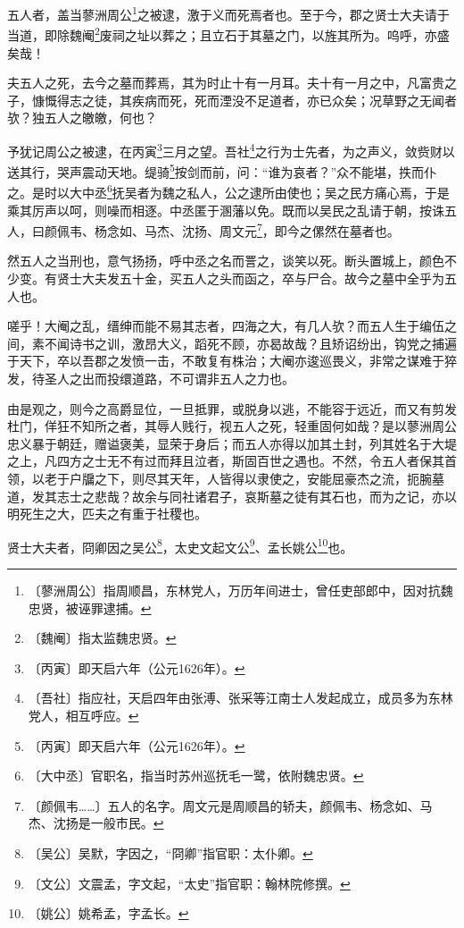 \documentclass[12pt,UTF-8,openany,a4]{ctexbook}
\begin{document}
\begin{large}
    
    五人者，盖当蓼洲周公\footnote{〔蓼洲周公〕\yiwen 指周顺昌，东林党人，万历年间进士，曾任吏部郎中，因对抗魏忠贤，被诬罪逮捕。}之被逮，激于义而死焉者也。至于今，郡之贤士大夫请于当道，即除魏阉\footnote{〔魏阉〕\yiwen 指太监魏忠贤。}废祠之址以葬之；且立石于其墓之门，以旌其所为。呜呼，亦盛矣哉！
    
    夫五人之死，去今之墓而葬焉，其为时止十有一月耳。夫十有一月之中，凡富贵之子，慷慨得志之徒，其疾病而死，死而湮没不足道者，亦已众矣；况草野之无闻者欤？独五人之皦皦，何也？
    
    予犹记周公之被逮，在丙寅\footnote{〔丙寅〕\yiwen 即天启六年（公元1626年）。}三月之望。吾社\footnote{〔吾社〕\yiwen 指应社，天启四年由张溥、张采等江南士人发起成立，成员多为东林党人，相互呼应。}之行为士先者，为之声义，敛赀财以送其行，哭声震动天地。缇骑\footnote{〔丙寅〕\yiwen 即天启六年（公元1626年）。}按剑而前，问：“谁为哀者？”众不能堪，抶而仆之。是时以大中丞\footnote{〔大中丞〕\yiwen 官职名，指当时苏州巡抚毛一鹭，依附魏忠贤。}抚吴者为魏之私人，公之逮所由使也；吴之民方痛心焉，于是乘其厉声以呵，则噪而相逐。中丞匿于溷藩以免。既而以吴民之乱请于朝，按诛五人，曰颜佩韦、杨念如、马杰、沈扬、周文元\footnote{〔颜佩韦……〕\yiwen 五人的名字。周文元是周顺昌的轿夫，颜佩韦、杨念如、马杰、沈扬是一般市民。}，即今之傫然在墓者也。
    
    然五人之当刑也，意气扬扬，呼中丞之名而詈之，谈笑以死。断头置城上，颜色不少变。有贤士大夫发五十金，买五人之头而函之，卒与尸合。故今之墓中全乎为五人也。
    
    嗟乎！大阉之乱，缙绅而能不易其志者，四海之大，有几人欤？而五人生于编伍之间，素不闻诗书之训，激昂大义，蹈死不顾，亦曷故哉？且矫诏纷出，钩党之捕遍于天下，卒以吾郡之发愤一击，不敢复有株治；大阉亦逡巡畏义，非常之谋难于猝发，待圣人之出而投缳道路，不可谓非五人之力也。
    
    由是观之，则今之高爵显位，一旦抵罪，或脱身以逃，不能容于远近，而又有剪发杜门，佯狂不知所之者，其辱人贱行，视五人之死，轻重固何如哉？是以蓼洲周公忠义暴于朝廷，赠谥褒美，显荣于身后；而五人亦得以加其土封，列其姓名于大堤之上，凡四方之士无不有过而拜且泣者，斯固百世之遇也。不然，令五人者保其首领，以老于户牖之下，则尽其天年，人皆得以隶使之，安能屈豪杰之流，扼腕墓道，发其志士之悲哉？故余与同社诸君子，哀斯墓之徒有其石也，而为之记，亦以明死生之大，匹夫之有重于社稷也。
    
    贤士大夫者，冏卿因之吴公\footnote{〔吴公〕\yiwen 吴默，字因之，“冏卿”指官职：太仆卿。}，太史文起文公\footnote{〔文公〕\yiwen 文震孟，字文起，“太史”指官职：翰林院修撰。}、孟长姚公\footnote{〔姚公〕\yiwen 姚希孟，字孟长。}也。

\end{large}
\end{document}
